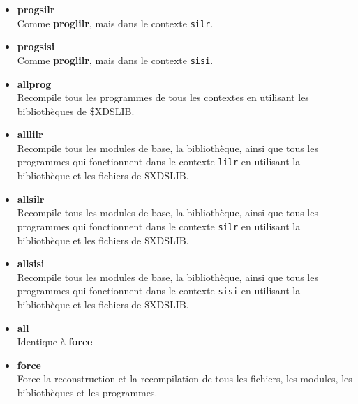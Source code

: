 \documentclass[11pt]{article}
\begin{document}
\begin{itemize}
REMARQUE: si on veut compiler un programme utilisant les modules
de  {\tt latmrg} sans passer par le Makefile, alors il faut d'abord choisir
le contexte appropri\'e dans le shell. Par exemple,
 pour compiler un programme {\tt prog.mod}
 qui fonctionne dans le contexte de {\tt select si si}, il faudra
appeler {\tt sisi} sur la ligne de commande du shell, puis 
compiler avec \\
\hspace*{10mm}  {\tt xm =m prog.mod}.


\item{\bf progsilr} \\
Comme {\bf proglilr}, mais dans le contexte {\tt silr}.

\item{\bf progsisi} \\
Comme {\bf proglilr}, mais dans le contexte {\tt sisi}.


\item{\bf allprog} \\
Recompile tous les programmes de tous les contextes en utilisant 
les biblioth\`eques de \$XDSLIB. %

\item{\bf alllilr} \\
Recompile tous les modules de base, la biblioth\`eque, 
ainsi que tous les programmes 
qui fonctionnent dans le contexte {\tt lilr} en utilisant 
la biblioth\`eque et les fichiers de \$XDSLIB. %

\item{\bf allsilr} \\
Recompile tous les modules de base, la biblioth\`eque, 
 ainsi que tous les programmes 
qui fonctionnent dans le contexte {\tt silr} en utilisant 
la biblioth\`eque et les fichiers de \$XDSLIB. %

\item{\bf allsisi} \\
Recompile tous les modules de base, la biblioth\`eque, 
 ainsi que tous les programmes 
qui fonctionnent dans le contexte {\tt sisi} en utilisant 
la biblioth\`eque et les fichiers de \$XDSLIB. %

\item{\bf all}\\
 Identique \`a {\bf force}

\item{\bf force} \\
Force la reconstruction et la recompilation de tous les fichiers, les
modules, les biblioth\`eques et les programmes.


\end{itemize}
\end{document}
